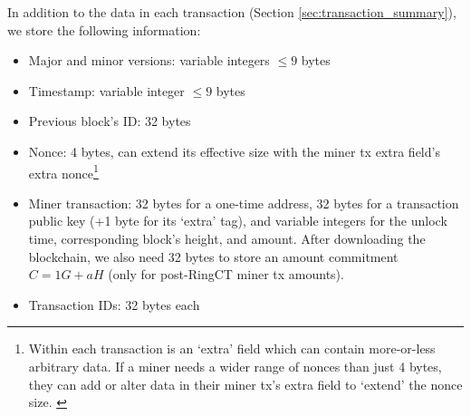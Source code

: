 In addition to the data in each transaction (Section \ref{sec:transaction_summary}), we store the following information:
\begin{itemize}
    \setlength\itemsep{\listspace}
    \item Major and minor versions: variable integers $\leq 9$ bytes
    \item Timestamp: variable integer $\leq 9$ bytes
    \item Previous block's ID: 32 bytes
    \item Nonce: 4 bytes, can extend its effective size with the miner tx extra field's extra nonce\footnote{Within each transaction is an `extra' field which can contain more-or-less arbitrary data. If a miner needs a wider range of nonces than just 4 bytes, they can add or alter data in their miner tx's extra field to `extend' the nonce size. \cite{extra-field-stackexchange}}
    \item Miner transaction: 32 bytes for a one-time address, 32 bytes for a transaction public key (+1 byte for its `extra' tag), and variable integers for the unlock time, corresponding block's height, and amount. After downloading the blockchain, we also need 32 bytes to store an amount commitment $C = 1G + a H$ (only for post-RingCT miner tx amounts).
    \item Transaction IDs: 32 bytes each
\end{itemize}